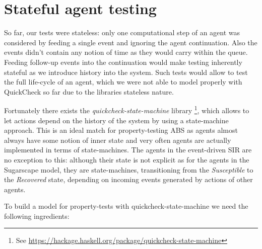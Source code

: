 \chapter{Stateful agent testing}
So far, our tests were stateless: only one computational step of an agent was considered by feeding a single event and ignoring the agent continuation. Also the events didn't contain any notion of time as they would carry within the queue. Feeding follow-up events into the continuation would make testing inherently stateful as we introduce history into the system. Such tests would allow to test the full life-cycle of an agent, which we were not able to model properly with QuickCheck so far due to the libraries stateless nature.

Fortunately there exists the \textit{quickcheck-state-machine} library \footnote{See \url{https://hackage.haskell.org/package/quickcheck-state-machine}}, which allows to let actions depend on the history of the system by using a state-machine approach. This is an ideal match for property-testing ABS as agents almost always have some notion of inner state and very often agents are actually implemented in terms of state-machines. The agents in the event-driven SIR are no exception to this: although their state is not explicit as for the agents in the Sugarscape model, they are state-machines, transitioning from the \textit{Susceptible} to the \textit{Recovered} state, depending on incoming events generated by actions of other agents.

To build a model for property-tests with quickcheck-state-machine we need the following ingredients:

